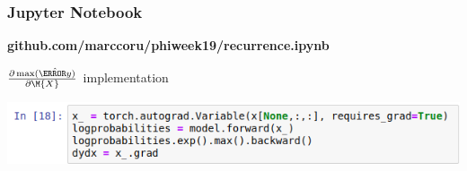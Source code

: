 \begin{frame}
	\frametitle{Jupyter Notebook}
	
	
	\Large
	\textbf{github.com/marccoru/phiweek19/recurrence.ipynb}
	
	\vspace{1em}
	
	\Large $\frac{\partial \max(\yhat)}{\partial \M{X}}$ implementation
	
	\includegraphics[width=\textwidth]{images/dydx_code}
	
\end{frame}
%
%
%
%
%
%
%
%
%
